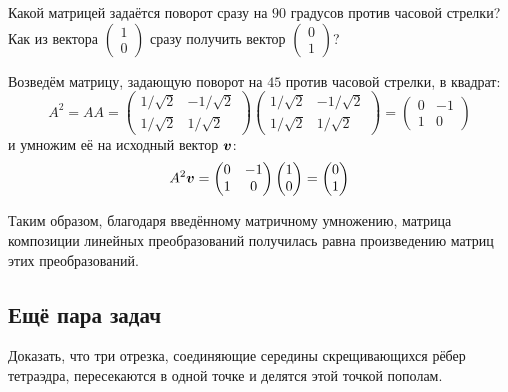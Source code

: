 \documentclass[a4paper,12pt]{article}
\begin{document}
  Какой матрицей задаётся поворот сразу на $90$ градусов против часовой стрелки?
  Как из вектора
  $\left(\begin{smallmatrix}1 \\ 0\end{smallmatrix}\right)$
  сразу получить вектор
  $\left(\begin{smallmatrix}0 \\ 1\end{smallmatrix}\right)$?
  
  Возведём матрицу, задающую поворот на $45$ против часовой стрелки, в квадрат:
  \[
    A^2
    = A A
    = \begin{pmatrix}
        1/\sqrt{2} & -1/\sqrt{2}\\
        1/\sqrt{2} & 1/\sqrt{2}
      \end{pmatrix}
      \begin{pmatrix}
        1/\sqrt{2} & -1/\sqrt{2}\\
        1/\sqrt{2} & 1/\sqrt{2}
      \end{pmatrix}
    = \begin{pmatrix}
        0 & -1\\
        1 & 0
      \end{pmatrix}
  \]
  и умножим её на исходный вектор $\boldsymbol v$:
  \[
    A^2 \boldsymbol v
    = \begin{pmatrix}
        0 & -1\\
        1 & 0
      \end{pmatrix}
      \begin{pmatrix}
        1 \\ 0
      \end{pmatrix}
    = \begin{pmatrix}
        0 \\ 1
      \end{pmatrix}
  \]
  
  Таким образом, благодаря введённому матричному умножению, матрица композиции линейных преобразований получилась равна произведению матриц этих преобразований.
  
  
  \subsection{Ещё пара задач}
  
  \begin{problem}[1.51]
    Доказать, что три отрезка, соединяющие середины скрещивающихся рёбер тетраэдра, пересекаются в одной точке и делятся этой точкой пополам.
  \end{problem}
\end{document}

